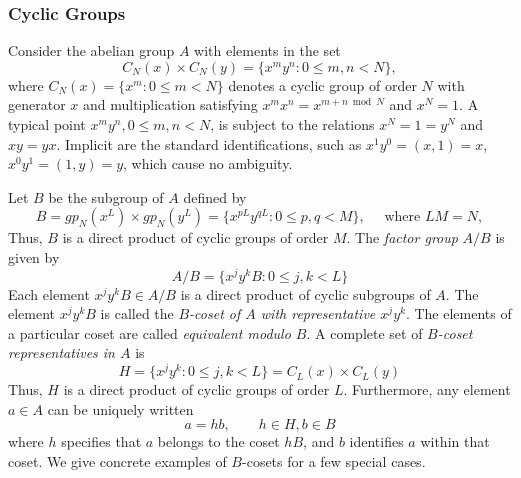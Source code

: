 \subsubsection{Cyclic Groups}

Consider the abelian group $A$ with elements in the set
\[
C_N(x) \times C_N(y) = \{x^m y^n : 0 \leq m,n < N \},
\]
where $C_N(x) = \{x^m : 0 \leq m < N \}$ denotes a cyclic group of
order $N$ with generator $x$ and multiplication satisfying
$x^mx^n = x^{m+n \bmod N}$ and $x^N=1$.
A typical point $x^my^n, 0\leq m,n < N$, is subject to the
relations $x^N = 1 = y^N$ and $xy = yx$. Implicit are the
standard identifications, such as $x^1y^0 = (x,1) = x$, $x^0y^1 =
(1,y) = y$, which cause no ambiguity.

Let $B$ be the subgroup of $A$ defined by
\[
B = gp_N(x^L) \times gp_N(y^L) = \{x^{pL} y^{qL} : 0 \leq p,q < M \}, \quad \text{ where } LM = N,
\]
Thus, $B$ is a direct product of cyclic groups of order $M$.
The \emph{factor group} $A/B$ is given by
\[
A/B = \{x^j y^k B : 0 \leq j,k < L \}
\]
Each element $x^j y^k B \in A/B$ is a direct product of cyclic subgroups of $A$.
The element $x^j y^k B$ is called the \emph{$B$-coset of $A$ with representative
$x^j y^k$}.  The elements of a particular coset are called \emph{equivalent modulo $B$}.
A complete set of \emph{$B$-coset representatives in $A$}  is 
\[
H = \{x^j y^k : 0 \leq j,k < L \} = C_L(x) \times C_L(y)
\]
Thus, $H$ is a direct product of cyclic groups of order $L$.
Furthermore, any element $a\in A$ can be uniquely written
\[
a = hb, \qquad h\in H, b\in B
\]
where $h$ specifies that $a$ belongs to the coset $hB$, and $b$ identifies $a$
within that coset. 
We give concrete examples of $B$-cosets for a few special cases.  
